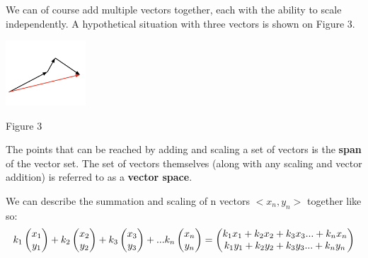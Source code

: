 \documentclass{article}
\begin{document}
\linebreak
\linebreak
\linebreak
\begin{minipage}[c]{.5\linewidth}
	\par \noindent We can of course add multiple vectors together, each with the ability to scale independently. A hypothetical situation with three vectors is shown on Figure 3.
\end{minipage}%
\begin{minipage}[c]{.5\linewidth}
\begin{center}
	\includegraphics[width=3cm]{matrix-scaling-3.png}
\end{center}
\begin{center}
	Figure 3
\end{center}
\end{minipage}
\newline
\newline
\newline
\par\noindent The points that can be reached by adding and scaling a set of vectors is the \textbf{span} of the vector set. The set of vectors themselves (along with any scaling and vector addition) is referred to as a \textbf{vector space}.
\newpage
\par \noindent We can describe the summation and scaling of n vectors \(<x_n, y_n>\) together like so:
\newline
\[
k_1
\left(\begin{array}{@{}c@{}}
	x_1 \\
	y_1 \\
\end{array}\right) + 
k_2
\left(\begin{array}{@{}c@{}}
	x_2 \\
	y_2 \\
\end{array}\right) + 
k_3
\left(\begin{array}{@{}c@{}}
	x_3 \\
	y_3 \\
\end{array}\right) + 
... 
k_n
\left(\begin{array}{@{}c@{}}
	x_n \\
	y_n \\
\end{array}\right) =
\left(\begin{array}{@{}c@{}}
	k_1 x_1 + k_2 x_2 + k_3 x_3... + k_n x_n \\
	k_1 y_1 + k_2 y_2 + k_3 y_3... + k_n y_n \\
\end{array}\right) 
\]
\end{document}
